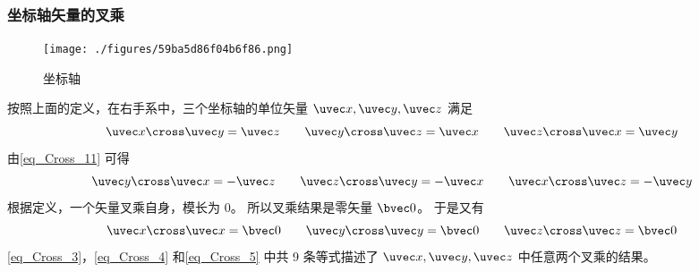 \subsubsection{坐标轴矢量的叉乘}
\begin{figure}[ht]
\centering
\texttt{[image: ./figures/59ba5d86f04b6f86.png]}
\caption{坐标轴} \label{fig_Cross_3}
\end{figure}
按照上面的定义，在右手系中，三个坐标轴的单位矢量 $\uvec x, \uvec y, \uvec z$ 满足
\begin{equation}\label{eq_Cross_3}
\uvec x \cross \uvec y = \uvec z
\qquad
\uvec y \cross \uvec z = \uvec x
\qquad
\uvec z \cross \uvec x = \uvec y
\end{equation}
由\autoref{eq_Cross_11} 可得
\begin{equation}\label{eq_Cross_4}
\uvec y \cross \uvec x =  - \uvec z
\qquad
\uvec z \cross \uvec y =  - \uvec x
\qquad
\uvec x \cross \uvec z =  - \uvec y
\end{equation}
根据定义，一个矢量叉乘自身，模长为 $0$。 所以叉乘结果是零矢量 $\bvec 0$。 于是又有
\begin{equation}\label{eq_Cross_5}
\uvec x \cross \uvec x = \bvec 0
\qquad
\uvec y \cross \uvec y = \bvec 0
\qquad
\uvec z \cross \uvec z = \bvec 0
\end{equation}
\autoref{eq_Cross_3}，\autoref{eq_Cross_4} 和\autoref{eq_Cross_5} 中共 9 条等式描述了 $\uvec x, \uvec y, \uvec z$ 中任意两个叉乘的结果。

